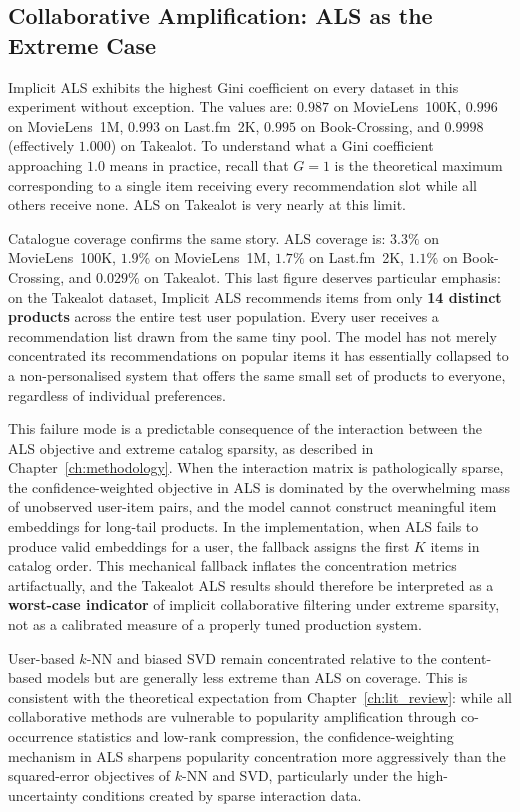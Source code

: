 \documentclass[11pt,a4paper]{report}
\begin{document}
\subsection*{Collaborative Amplification: ALS as the Extreme Case}

Implicit ALS exhibits the highest Gini coefficient on every dataset in this experiment without exception. The values are: $0.987$ on MovieLens~100K, $0.996$ on MovieLens~1M, $0.993$ on Last.fm~2K, $0.995$ on Book-Crossing, and $0.9998$ (effectively $1.000$) on Takealot. To understand what a Gini coefficient approaching $1.0$ means in practice, recall that $G = 1$ is the theoretical maximum corresponding to a single item receiving every recommendation slot while all others receive none. ALS on Takealot is very nearly at this limit.

Catalogue coverage confirms the same story. ALS coverage is: $3.3\%$ on MovieLens~100K, $1.9\%$ on MovieLens~1M, $1.7\%$ on Last.fm~2K, $1.1\%$ on Book-Crossing, and $0.029\%$ on Takealot. This last figure deserves particular emphasis: on the Takealot dataset, Implicit ALS recommends items from only \textbf{14 distinct products} across the entire test user population. Every user receives a recommendation list drawn from the same tiny pool. The model has not merely concentrated its recommendations on popular items it has essentially collapsed to a non-personalised system that offers the same small set of products to everyone, regardless of individual preferences.

This failure mode is a predictable consequence of the interaction between the ALS objective and extreme catalog sparsity, as described in Chapter~\ref{ch:methodology}. When the interaction matrix is pathologically sparse, the confidence-weighted objective in ALS is dominated by the overwhelming mass of unobserved user-item pairs, and the model cannot construct meaningful item embeddings for long-tail products. In the implementation, when ALS fails to produce valid embeddings for a user, the fallback assigns the first $K$ items in catalog order. This mechanical fallback inflates the concentration metrics artifactually, and the Takealot ALS results should therefore be interpreted as a \textbf{worst-case indicator} of implicit collaborative filtering under extreme sparsity, not as a calibrated measure of a properly tuned production system.

User-based $k$-NN and biased SVD remain concentrated relative to the content-based models but are generally less extreme than ALS on coverage. This is consistent with the theoretical expectation from Chapter~\ref{ch:lit_review}: while all collaborative methods are vulnerable to popularity amplification through co-occurrence statistics and low-rank compression, the confidence-weighting mechanism in ALS sharpens popularity concentration more aggressively than the squared-error objectives of $k$-NN and SVD, particularly under the high-uncertainty conditions created by sparse interaction data.
\end{document}
